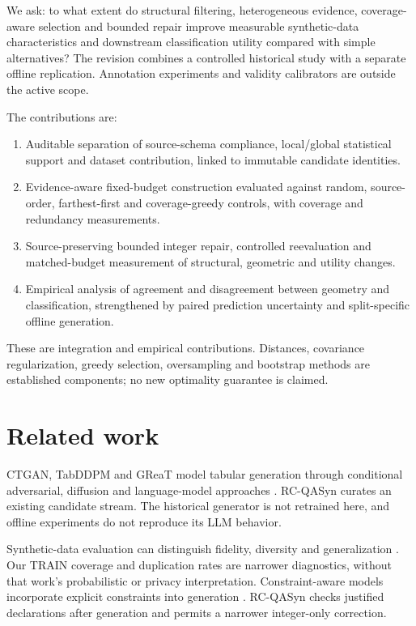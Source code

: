 We ask: to what extent do structural filtering, heterogeneous evidence, coverage-aware selection and bounded repair improve measurable synthetic-data characteristics and downstream classification utility compared with simple alternatives? The revision combines a controlled historical study with a separate offline replication. Annotation experiments and validity calibrators are outside the active scope.

The contributions are:
\begin{enumerate}
\item Auditable separation of source-schema compliance, local/global statistical support and dataset contribution, linked to immutable candidate identities.
\item Evidence-aware fixed-budget construction evaluated against random, source-order, farthest-first and coverage-greedy controls, with coverage and redundancy measurements.
\item Source-preserving bounded integer repair, controlled reevaluation and matched-budget measurement of structural, geometric and utility changes.
\item Empirical analysis of agreement and disagreement between geometry and classification, strengthened by paired prediction uncertainty and split-specific offline generation.
\end{enumerate}
These are integration and empirical contributions. Distances, covariance regularization, greedy selection, oversampling and bootstrap methods are established components; no new optimality guarantee is claimed.

\section{Related work}
CTGAN, TabDDPM and GReaT model tabular generation through conditional adversarial, diffusion and language-model approaches \citep{xu2019ctgan,kotelnikov2023tabddpm,borisov2023great}. RC-QASyn curates an existing candidate stream. The historical generator is not retrained here, and offline experiments do not reproduce its LLM behavior.

Synthetic-data evaluation can distinguish fidelity, diversity and generalization \citep{alaa2022faithful}. Our TRAIN coverage and duplication rates are narrower diagnostics, without that work's probabilistic or privacy interpretation. Constraint-aware models incorporate explicit constraints into generation \citep{stoian2024realistic}. RC-QASyn checks justified declarations after generation and permits a narrower integer-only correction.

